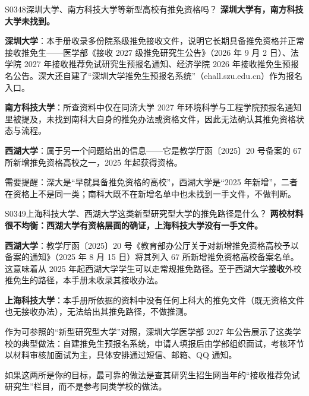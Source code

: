 \begin{qa}{S0348}{深圳大学、南方科技大学等新型高校有推免资格吗？}
\textbf{深圳大学有，南方科技大学未找到。}

\textbf{深圳大学}：本手册收录多份院系级推免接收文件，说明它长期具备推免资格并正常接收推免生——医学部《接收 2027 级推免研究生公告》（2026 年 9 月 2 日）、法学院 2027 年接收推荐免试研究生预报名通知、经济学院 2026 年接收推免生预报名公告。深大还自建了“深圳大学推免生预报名系统”（ehall.szu.edu.cn）作为报名入口。

\textbf{南方科技大学}：所查资料中仅在同济大学 2027 年环境科学与工程学院预报名通知里被提及，未找到南科大自身的推免办法或资格文件，因此无法确认其推免资格状态与流程。

\textbf{西湖大学}：属于另一个问题给出的信息——它是教学厅函〔2025〕20 号备案的 67 所新增推免资格高校之一，2025 年起获得资格。

需要提醒：深大是“早就具备推免资格的高校”，西湖大学是“2025 年新增”，二者在资格上不是同一类；南科大既不在新增名单中也未找到一手文件，不做判断。
\end{qa}

\begin{qa}{S0349}{上海科技大学、西湖大学这类新型研究型大学的推免路径是什么？}
\textbf{两校材料很不均衡：西湖大学有资格层面的确证，上海科技大学没有一手文件。}

\textbf{西湖大学}：教学厅函〔2025〕20 号《教育部办公厅关于对新增推免资格高校予以备案的通知》（2025 年 8 月 15 日）将其列入 67 所新增推免资格高校备案名单。这意味着从 2025 年起西湖大学学生可以走常规推免路径。至于西湖大学\textbf{接收}外校推免生的路径，本手册未收录其接收办法。

\textbf{上海科技大学}：本手册所依据的资料中没有任何上科大的推免文件（既无资格文件也无接收办法），无法给出其推免路径，不做推测。

作为可参照的“新型研究型大学”对照，深圳大学医学部 2027 年公告展示了这类学校的典型做法：自建推免生预报名系统，申请人填报后由学部组织面试，考核环节以材料审核加面试为主，具体安排通过短信、邮箱、QQ 通知。

如果这两所是你的目标，最可靠的做法是查其研究生招生网当年的“接收推荐免试研究生”栏目，而不是参考同类学校的做法。
\end{qa}

